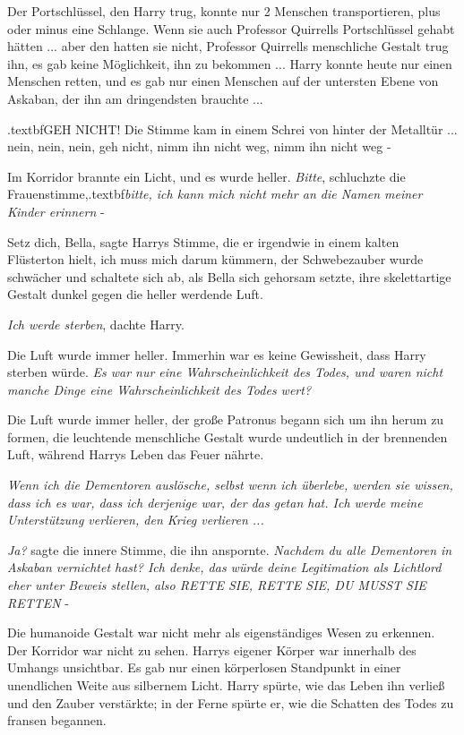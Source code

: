 Der Portschlüssel, den Harry trug, konnte nur 2 Menschen transportieren, plus
oder minus eine Schlange. Wenn sie auch Professor Quirrells Portschlüssel gehabt
hätten ... aber den hatten sie nicht, Professor Quirrells menschliche Gestalt
trug ihn, es gab keine Möglichkeit, ihn zu bekommen ... Harry konnte heute nur
einen Menschen retten, und es gab nur einen Menschen auf der untersten Ebene von
Askaban, der ihn am dringendsten brauchte ...

\grqq{}.textbf{GEH NICHT!}\grqq{} Die Stimme kam in einem Schrei von hinter der
Metalltür ... nein, nein, nein, geh nicht, nimm ihn nicht weg, nimm ihn nicht weg
-\grqq{}

Im Korridor brannte ein Licht, und es wurde heller. \glqq{}\emph{Bitte}\grqq{},
schluchzte die Frauenstimme,\grqq{}.textbf{\emph{bitte, ich kann mich nicht mehr
an die Namen meiner Kinder erinnern} }-\grqq{}

\glqq{}Setz dich, Bella\grqq{}, sagte Harrys Stimme, die er irgendwie in einem
kalten Flüsterton hielt, \glqq{}ich muss mich darum kümmern\grqq{}, der
Schwebezauber wurde schwächer und schaltete sich ab, als Bella sich gehorsam
setzte, ihre skelettartige Gestalt dunkel gegen die heller werdende Luft.

\emph{Ich werde sterben}, dachte Harry.

Die Luft wurde immer heller. Immerhin war es keine Gewissheit, dass Harry
sterben würde. \emph{Es war nur eine Wahrscheinlichkeit des Todes, und waren
nicht manche Dinge eine Wahrscheinlichkeit des Todes wert?}

Die Luft wurde immer heller, der große Patronus begann sich um ihn herum zu
formen, die leuchtende menschliche Gestalt wurde undeutlich in der brennenden
Luft, während Harrys Leben das Feuer nährte.

\emph{Wenn ich die Dementoren auslösche, selbst wenn ich überlebe, werden sie
wissen, dass ich es war, dass ich derjenige war, der das getan hat. Ich werde
meine Unterstützung verlieren, den Krieg verlieren ...}

\emph{Ja?} sagte die innere Stimme, die ihn anspornte. \emph{Nachdem du alle
Dementoren in Askaban vernichtet hast? Ich denke, das würde deine Legitimation
als Lichtlord eher unter Beweis stellen, also RETTE SIE, RETTE SIE, DU MUSST SIE
RETTEN} -

Die humanoide Gestalt war nicht mehr als eigenständiges Wesen zu erkennen. Der
Korridor war nicht zu sehen. Harrys eigener Körper war innerhalb des Umhangs
unsichtbar. Es gab nur einen körperlosen Standpunkt in einer unendlichen Weite
aus silbernem Licht. Harry spürte, wie das Leben ihn verließ und den Zauber
verstärkte; in der Ferne spürte er, wie die Schatten des Todes zu fransen
begannen.

